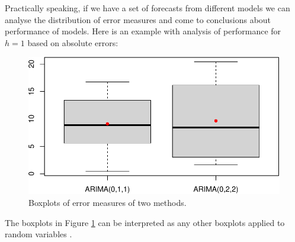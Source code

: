 \documentclass[
]{book}
\newenvironment{Shaded}{\begin{snugshade}}{\end{snugshade}}
\newcommand{\AttributeTok}[1]{\textcolor[rgb]{0.77,0.63,0.00}{#1}}
\newcommand{\DecValTok}[1]{\textcolor[rgb]{0.00,0.00,0.81}{#1}}
\newcommand{\FunctionTok}[1]{\textcolor[rgb]{0.00,0.00,0.00}{#1}}
\newcommand{\NormalTok}[1]{#1}
\newcommand{\OtherTok}[1]{\textcolor[rgb]{0.56,0.35,0.01}{#1}}
\newcommand{\SpecialCharTok}[1]{\textcolor[rgb]{0.00,0.00,0.00}{#1}}
\newcommand{\StringTok}[1]{\textcolor[rgb]{0.31,0.60,0.02}{#1}}
\theoremstyle{definition}
\theoremstyle{definition}
\theoremstyle{definition}
\theoremstyle{definition}
\theoremstyle{remark}
\begin{document}
Practically speaking, if we have a set of forecasts from different models we can analyse the distribution of error measures and come to conclusions about performance of models. Here is an example with analysis of performance for \(h=1\) based on absolute errors:

\begin{Shaded}
\end{Shaded}

\begin{figure}
\centering
\includegraphics{Svetunkov--2022----ADAM_files/figure-latex/roExample02-1.pdf}
\caption{\label{fig:roExample02}Boxplots of error measures of two methods.}
\end{figure}

The boxplots in Figure \ref{fig:roExample02} can be interpreted as any other boxplots applied to random variables \citep[see, for example, discussion in Section 2.2 of][]{SvetunkovSBA}.
\end{document}
